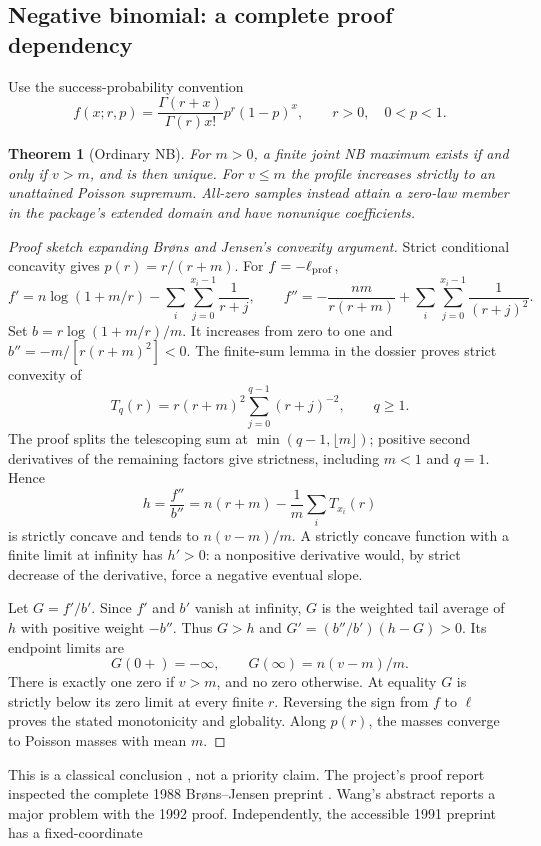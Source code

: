 \documentclass[12pt]{article}
\newtheorem{theorem}{Theorem}[section]
\theoremstyle{definition}
\theoremstyle{remark}
\begin{document}
\subsection{Negative binomial: a complete proof dependency}
Use the success-probability convention
\[
 f(x;r,p)=\frac{\Gamma(r+x)}{\Gamma(r)x!}p^r(1-p)^x,
 \qquad r>0,\quad 0<p<1.
\]
\begin{theorem}[Ordinary NB]\label{thm:nb}
For $m>0$, a finite joint NB maximum exists if and only if $v>m$, and is then
unique. For $v\le m$ the profile increases strictly to an unattained Poisson
supremum. All-zero samples instead attain a zero-law member in the package's
extended domain and have nonunique coefficients.
\end{theorem}
\begin{proof}[Proof sketch expanding Br\o ns and Jensen's convexity argument]
Strict conditional concavity gives $p(r)=r/(r+m)$. For $f=-\ell_{\rm prof}$,
\[
 f'=n\log(1+m/r)-\sum_i\sum_{j=0}^{x_i-1}\frac1{r+j},\qquad
 f''=-\frac{nm}{r(r+m)}+\sum_i\sum_{j=0}^{x_i-1}\frac1{(r+j)^2}.
\]
Set $b=r\log(1+m/r)/m$. It increases from zero to one and
$b''=-m/[r(r+m)^2]<0$. The finite-sum lemma in the dossier proves strict
convexity of
\[
 T_q(r)=r(r+m)^2\sum_{j=0}^{q-1}(r+j)^{-2},\qquad q\ge1.
\]
The proof splits the telescoping sum at $\min(q-1,\lfloor m\rfloor)$;
positive second derivatives of the remaining factors give strictness,
including $m<1$ and $q=1$. Hence
\[
 h=\frac{f''}{b''}=n(r+m)-\frac1m\sum_iT_{x_i}(r)
\]
is strictly concave and tends to $n(v-m)/m$. A strictly concave function
with a finite limit at infinity has $h'>0$: a nonpositive derivative would,
by strict decrease of the derivative, force a negative eventual slope.

Let $G=f'/b'$. Since $f'$ and $b'$ vanish at infinity, $G$ is the weighted
tail average of $h$ with positive weight $-b''$. Thus $G>h$ and
$G'=(b''/b')(h-G)>0$. Its endpoint limits are
\[
 G(0+)=-\infty,\qquad G(\infty)=n(v-m)/m.
\]
There is exactly one zero if $v>m$, and no zero otherwise. At equality $G$
is strictly below its zero limit at every finite $r$. Reversing the sign from
$f$ to $\ell$ proves the stated monotonicity and globality. Along $p(r)$,
the masses converge to Poisson masses with mean $m$.
\end{proof}
This is a classical conclusion \cite{anscombe,levin,aragon}, not a priority
claim. The project's proof report inspected the complete 1988 Br\o ns--Jensen
preprint \cite{brons}. Wang's abstract \cite{wang} reports a major problem with the 1992
proof. Independently, the accessible 1991 preprint has a fixed-coordinate
\end{document}
